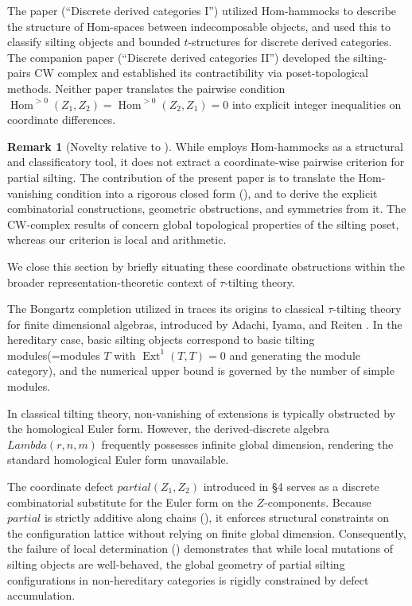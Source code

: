 \documentclass[11pt, a4paper]{article}
\theoremstyle{definition}
\newtheorem{remark}[theorem]{Remark}
\def\Lambda{Lambda}%
\def\partial{partial}%
\def\mathcal#1{#1}%
\begin{document}
The paper \cite{BPP2017} (``Discrete derived categories I'') utilized Hom-hammocks to describe the structure of Hom-spaces between indecomposable objects, and used this to classify silting objects and bounded $t$-structures for discrete derived categories. The companion paper \cite{BPP2016} (``Discrete derived categories II'') developed the silting-pairs CW complex and established its contractibility via poset-topological methods. Neither paper translates the pairwise condition $\operatorname{Hom}^{>0}(Z_1,Z_2)=\operatorname{Hom}^{>0}(Z_2,Z_1)=0$ into explicit integer inequalities on coordinate differences.

\begin{remark}[Novelty relative to \cite{BPP2017,BPP2016}]\label{rem:novelty}
While \cite{BPP2017} employs Hom-hammocks as a structural and classificatory tool, it does not extract a coordinate-wise pairwise criterion for partial silting. The contribution of the present paper is to translate the Hom-vanishing condition into a rigorous closed form (), and to derive the explicit combinatorial constructions, geometric obstructions, and symmetries from it. The CW-complex results of \cite{BPP2016} concern global topological properties of the silting poset, whereas our criterion is local and arithmetic.
\end{remark}

We close this section by briefly situating these coordinate obstructions within the broader representation-theoretic context of $\tau$-tilting theory.

The Bongartz completion utilized in  traces its origins to classical $\tau$-tilting theory for finite dimensional algebras, introduced by Adachi, Iyama, and Reiten \cite{AIR2014}. In the hereditary case, basic silting objects correspond to basic tilting modules(=modules $T$ with $\operatorname{Ext}^1(T,T)=0$ and generating the module category), and the numerical upper bound is governed by the number of simple modules.

In classical tilting theory, non-vanishing of extensions is typically obstructed by the homological Euler form. However, the derived-discrete algebra $\Lambda(r,n,m)$ frequently possesses infinite global dimension, rendering the standard homological Euler form unavailable.

The coordinate defect $\partial(Z_1,Z_2)$ introduced in \S 4 serves as a discrete combinatorial substitute for the Euler form on the $\mathcal Z$-components. Because $\partial$ is strictly additive along chains (), it enforces structural constraints on the configuration lattice without relying on finite global dimension. Consequently, the failure of local determination () demonstrates that while local mutations of silting objects are well-behaved, the global geometry of partial silting configurations in non-hereditary categories is rigidly constrained by defect accumulation.
\end{document}

